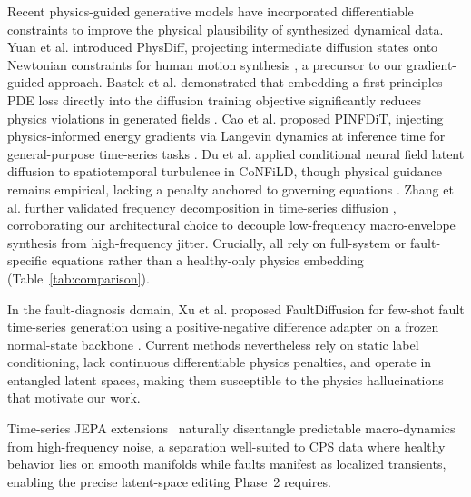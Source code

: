\documentclass[conference]{IEEEtran}
\begin{document}
Recent physics-guided generative models have incorporated differentiable constraints to improve the physical plausibility of synthesized dynamical data. Yuan et al. introduced PhysDiff, projecting intermediate diffusion states onto Newtonian constraints for human motion synthesis \cite{physdiff2023}, a precursor to our gradient-guided approach. Bastek et al. demonstrated that embedding a first-principles PDE loss directly into the diffusion training objective significantly reduces physics violations in generated fields \cite{bastek2025}. Cao et al. proposed PINFDiT, injecting physics-informed energy gradients via Langevin dynamics at inference time for general-purpose time-series tasks \cite{pinfdit2026}. Du et al. applied conditional neural field latent diffusion to spatiotemporal turbulence in CoNFiLD, though physical guidance remains empirical, lacking a penalty anchored to governing equations \cite{confild2024}. Zhang et al. further validated frequency decomposition in time-series diffusion \cite{zhang2026frequency}, corroborating our architectural choice to decouple low-frequency macro-envelope synthesis from high-frequency jitter. Crucially, all rely on full-system or fault-specific equations rather than a healthy-only physics embedding (Table~\ref{tab:comparison}).

 
In the fault-diagnosis domain, Xu et al. proposed FaultDiffusion for few-shot fault time-series generation using a positive-negative difference adapter on a frozen normal-state backbone \cite{xu2025faultdiffusion}. Current methods nevertheless rely on static label conditioning, lack continuous differentiable physics penalties, and operate in entangled latent spaces, making them susceptible to the physics hallucinations that motivate our work.
 
Time-series JEPA extensions~\cite{ennadir2025tsjepa, he2026mtsjepa, verdenius2024latpfn} naturally disentangle predictable macro-dynamics from high-frequency noise, a separation well-suited to CPS data where healthy behavior lies on smooth manifolds while faults manifest as localized transients, enabling the precise latent-space editing Phase~2 requires.
\end{document}
